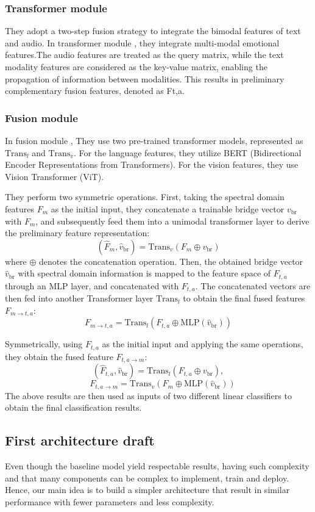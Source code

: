 \documentclass{article}
\begin{document}
\subsubsection{Transformer module}
They adopt a two-step fusion strategy to integrate the bimodal features of text and audio. In transformer module , they integrate multi-modal emotional features.The audio features are treated as the query matrix, while the text modality features are considered as the key-value matrix, enabling the propagation of information between modalities. This results in preliminary complementary fusion features, denoted as Ft,a.

\subsubsection{Fusion module}
In fusion module , They use two pre-trained transformer models, represented as $\text{Trans}_l$ and $\text{Trans}_v$. For the language features, they utilize BERT (Bidirectional Encoder Representations from Transformers). For the vision features, they use Vision Transformer (ViT).

They perform two symmetric operations. First, taking the spectral domain features $F_m$ as the initial input, they concatenate a trainable bridge vector $v_{\text{br}}$ with $F_m$, and subsequently feed them into a unimodal transformer layer to derive the preliminary feature representation:
\[
(\hat{F}_m, \hat{v}_{\text{br}}) = \text{Trans}_v(F_m \oplus v_{\text{br}})
\]
where $\oplus$ denotes the concatenation operation. Then, the obtained bridge vector $\hat{v}_{\text{br}}$ with spectral domain information is mapped to the feature space of $F_{t,a}$ through an MLP layer, and concatenated with $F_{t,a}$. The concatenated vectors are then fed into another Transformer layer $\text{Trans}_l$ to obtain the final fused features $F_{m \rightarrow t,a}$:
\[
F_{m \rightarrow t,a} = \text{Trans}_l(F_{t,a} \oplus \text{MLP}(\hat{v}_{\text{br}}))
\]

Symmetrically, using $F_{t,a}$ as the initial input and applying the same operations, they obtain the fused feature $F_{t,a \rightarrow m}$:
\[
(\hat{F}_{t,a}, \hat{v}_{\text{br}}) = \text{Trans}_l(F_{t,a} \oplus v_{\text{br}}),
\]
\[
 \quad
F_{t,a \rightarrow m} = \text{Trans}_v(F_m \oplus \text{MLP}(\hat{v}_{\text{br}}))
\]
The above results are then used as inputs of two different linear classifiers to obtain the final classification results.

\subsection{First architecture draft}
Even though the baseline model yield respectable results, having such complexity and that many components can be complex to implement, train and deploy. Hence, our main idea is to build a simpler architecture that result in similar performance with fewer parameters and less complexity.
\end{document}
